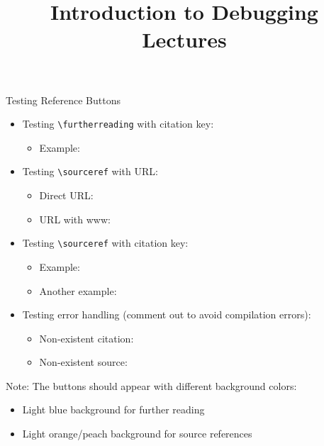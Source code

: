\documentclass[11pt,compress,t,notes=noshow, xcolor=table]{beamer}
\title{Introduction to Debugging Lectures}
\begin{document}

\begin{frame}{Testing Reference Buttons }

\begin{itemize}
\item Testing \texttt{\textbackslash furtherreading} with citation key:
  \begin{itemize}
  \item Example: 
  \end{itemize}

\item Testing \texttt{\textbackslash sourceref} with URL:
  \begin{itemize}
  \item Direct URL: 
  \item URL with www: 
  \end{itemize}

\item Testing \texttt{\textbackslash sourceref} with citation key:
  \begin{itemize}
  \item Example: 
  \item Another example: 
  \end{itemize}
  
\item Testing error handling (comment out to avoid compilation errors):
  \begin{itemize}
  \item Non-existent citation: %
  \item Non-existent source: %
  \end{itemize}

\end{itemize}

\vspace{1em}
Note: The buttons should appear with different background colors:
\begin{itemize}
\item Light blue background for further reading
\item Light orange/peach background for source references
\end{itemize}

\end{frame}

\endlecture
\end{document}
